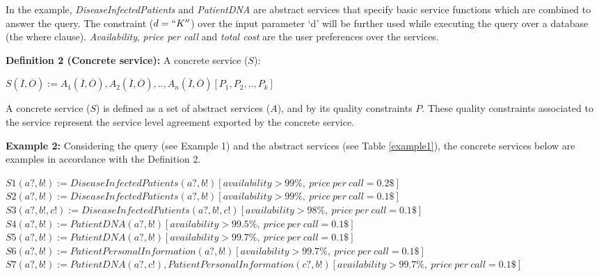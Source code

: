 \documentclass[12pt,a4paper,oneside]{article}
\begin{document}
In the example, \textit{DiseaseInfectedPatients} and \textit{PatientDNA} are abstract services that specify basic service functions which are combined to answer the query. 
The constraint ($d = ``K''$) over the input parameter `d' will be further used while executing the query over a database (the where clause). 
\textit{Availability}, \textit{price per call} and \textit{total cost} are the user preferences over the services.

\noindent \textbf{Definition 2 (Concrete service):} A concrete service ($S$):
\begin{center}
$S (\overline{I}, \overline{O}) := A_{1}(\overline{I}, \overline{O}), A_{2}(\overline{I}, \overline{O}), ..,  A_{n}(\overline{I}, \overline{O})[P_{1},P_{2}, .., P_{k}]$
\end{center}  
A concrete service ($S$) is defined as a set of abstract services ($A$), and by its quality constraints $P$. 
These quality constraints associated to the service represent the service level agreement exported by the concrete service.

\noindent \textbf{Example 2:} Considering the query (see Example 1) and the abstract services (see Table \ref{example1}), the concrete services below are examples in accordance with the Definition 2.

\begin{flushleft}
$S1 (a?, b!) := DiseaseInfectedPatients(a?, b!)[availability > 99\%, \ price \ per \ call = 0.2\$]$ \\
$S2 (a?, b!) := DiseaseInfectedPatients(a?, b!)[availability > 99\%, \ price \ per \ call = 0.1\$]$ \\
$S3 (a?, b!, c!) := DiseaseInfectedPatients(a?, b!, c!)[availability > 98\%, \ price \ per \ call = 0.1\$]$ \\
$S4 (a?, b!) := PatientDNA(a?, b!)[availability > 99.5\%, \ price \ per \ call = 0.1\$]$ \\
$S5 (a?, b!) := PatientDNA(a?, b!)[availability > 99.7\%, \ price \ per \ call = 0.1\$]$ \\
$S6 (a?, b!) := PatientPersonalInformation(a?, b!)[availability > 99.7\%, \ price \ per \ call = 0.1\$]$ \\
$S7 (a?, b!) := PatientDNA(a?, c!),PatientPersonalInformation(c?, b!)[availability > 99.7\%, \ price \ per \ call = 0.1\$]$ \\
\end{flushleft}
\end{document}
